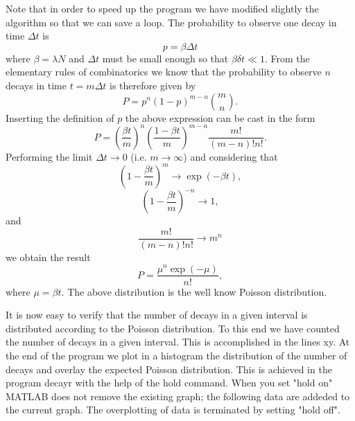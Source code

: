 Note that in order to speed up the program we have modified slightly 
the algorithm  so that we can save a loop.
The probability to observe one decay in time $\Delta t$ is
\begin{equation}
p = \beta \Delta t
\end{equation}
where $\beta = \lambda N$ and $\Delta t$ must be small enough so 
that $\beta \delta t \ll 1$. 
From the elementary rules of combinatorics we know that
the probability to observe $n$ decays in time $t=m\Delta t$ is therefore
given by
\begin{equation}
P = p^n(1-p)^{m-n} {m \choose n}.
\end{equation}
Inserting the definition of $p$ the above expression can be cast 
in the form
\begin{equation}
P = \left( \frac{\beta t}{m}\right)^n 
     \left( \frac{1 - \beta t}{m} \right)^{m-n}
      \frac{m!}{(m-n)! n!}.
\end{equation}
Performing the limit $\Delta t \longrightarrow 0$ (i.e. $m 
\longrightarrow \infty$) and considering that
\begin{equation}
\left(1-  \frac{\beta t}{m} \right)^{m} \longrightarrow 
            \exp(-\beta t),
\end{equation}
\begin{equation}
\left( 1- \frac{ \beta t}{m} \right)^{-n} \longrightarrow 
            1,
\end{equation}
and
\begin{equation}
\frac{m!}{(m-n)! n!} \longrightarrow m^n
\end{equation}
we obtain the result
\begin{equation}
P = \frac{\mu^n \exp(-\mu)}{n!},
\end{equation}
where $\mu = \beta t$. The above distribution is the well know
Poisson distribution.

It is now easy to verify that the number of decays in a given 
interval is distributed according to the Poisson distribution.
To this end we have counted the number of decays in a given 
interval. This is accomplished in the lines xy. At the end of the
program we plot in a histogram the distribution of the number of 
decays and overlay the expected Poisson
distribution.  This is achieved in the program {\sf decayr} with the 
help of the {\sf hold} command. When you set "{\sf hold on}" MATLAB does not 
remove the existing graph; the following data are addeded to the 
current graph. The overplotting of data is terminated by 
setting "{\sf hold off}".

